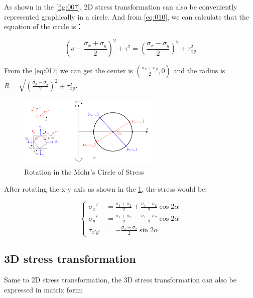 \documentclass[en,hazy,cyan,8pt,normal]{elegantnote}
\numberwithin{equation}{section}
\begin{document}
    As shown in the \cref{fig:007}, 2D stress transformation can also be conveniently represented graphically in a circle. And from \cref{eq:010}, we can calculate that the equation of the circle is：

    \begin{equation}\label{eq:017}
      \left( \sigma - \frac{\sigma_x + \sigma_y}{2} \right)^2 + \tau^2 = \left( \frac{\sigma_x - \sigma_y}{2} \right)^2 + \tau_{xy}^2
    \end{equation}

    From the \cref{eq:017} we can get the center is $\displaystyle \left(\frac{\sigma_x + \sigma_y}{2}, 0\right)$ and the radius is $\displaystyle R=\sqrt{\left( \frac{\sigma_x - \sigma_y}{2} \right)^2 + \tau_{xy}^2}$.

    \begin{figure}[H]
      \centering
      \includegraphics[width=0.6\textwidth]{image/008.png}
      \caption{Rotation in the Mohr's Circle of Stress}
      \label{fig:008}
    \end{figure}

    After rotating the x-y axis as shown in the \cref{fig:008}, the stress would be:

    \begin{equation}\label{eq:018}
      \left\{
      \begin{aligned}
        \sigma_x'&=\frac{\sigma_1+\sigma_2}{2}+\frac{\sigma_1-\sigma_2}{2}\cos2\alpha\\
        \sigma_y'&=\frac{\sigma_1+\sigma_2}{2}-\frac{\sigma_1-\sigma_2}{2}\cos2\alpha\\
        \tau_{x'y'}&=-\frac{\sigma_1-\sigma_2}{2}\sin2\alpha
      \end{aligned}
      \right.
    \end{equation}
  
  \subsection{3D stress transformation}
    Same to 2D stress transformation, the 3D stress transformation can also be expressed in matrix form:
\end{document}
